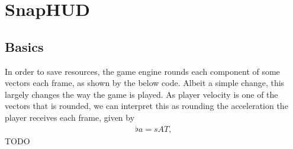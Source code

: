 \section{SnapHUD}
\label{sec:snaphud}

\subsection{Basics}
\label{sec:basics}
In order to save resources, the game engine rounds each component of some vectors each frame, as shown by the below code. Albeit a simple change, this largely changes the way the game is played.
As player velocity is one of the vectors that is rounded, we can interpret this as rounding the acceleration the player receives each frame, given by
\begin{align*}
\flat{a} = sAT,
\end{align*}
TODO
